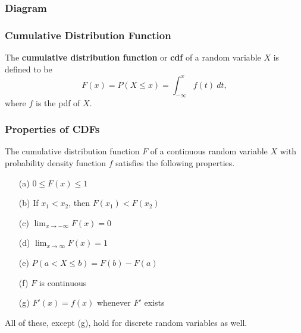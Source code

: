 \documentclass{beamer}
\begin{document}
\begin{frame}
\frametitle{Diagram}
\begin{center}
\end{center}
\end{frame}

\begin{frame}
\frametitle{Cumulative Distribution Function}
\begin{Definition}
The {\bf cumulative distribution function} or {\bf cdf} of a random variable $X$ is defined to be
$$
F(x) = P(X \leq x) = \int_{-\infty}^x f(t)\ dt,
$$
where $f$ is the pdf of $X$.
\end{Definition} 

\end{frame}

\begin{frame}
\frametitle{Properties of CDFs}
\small
The cumulative distribution function $F$ of a continuous random variable $X$ with probability density function $f$ satisfies the following properties.
\begin{multicols}{2}
\begin{enumerate}
\item[(a)] $0 \leq F(x) \leq 1$
\item[(b)] If $x_1 < x_2$, then $F(x_1) < F(x_2)$
\item[(c)] $\displaystyle\lim_{x\to-\infty} F(x) = 0$
\item[(d)] $\displaystyle\lim_{x\to\infty} F(x) = 1$
\item[(e)] $P(a < X \leq b) = F(b) - F(a)$
\item[(f)] $F$ is continuous 
\item[(g)] $F'(x) = f(x)$ whenever $F'$ exists
\end{enumerate}
\end{multicols}
All of these, except (g), hold for discrete random variables as well.
\end{frame}
\end{document}
